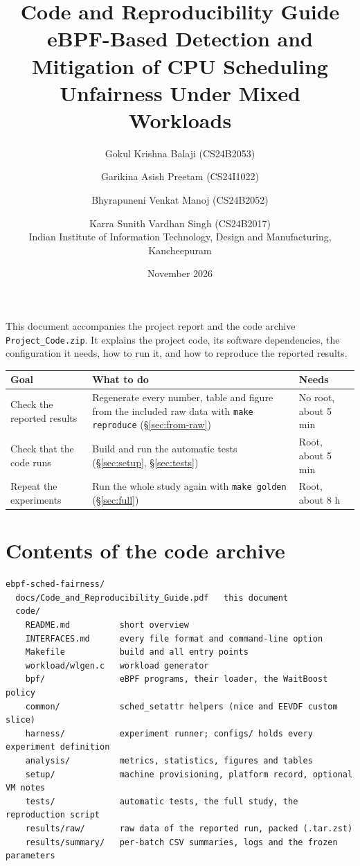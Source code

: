 \documentclass[10.5pt,a4paper]{article}
\title{\textbf{Code and Reproducibility Guide}\\[4pt]
\large eBPF-Based Detection and Mitigation of CPU Scheduling Unfairness Under Mixed Workloads}
\author{Gokul Krishna Balaji (CS24B2053) \and Garikina Asish Preetam (CS24I1022) \and
Bhyrapuneni Venkat Manoj (CS24B2052) \and Karra Sunith Vardhan Singh (CS24B2017)\\[4pt]
\normalsize Indian Institute of Information Technology, Design and Manufacturing, Kancheepuram}
\date{November 2026}
\newcommand{\f}[1]{\texttt{#1}}
\begin{document}
\maketitle

This document accompanies the project report and the code archive \f{Project\_Code.zip}. It explains the project code, its software dependencies, the configuration it needs, how to run it, and how to reproduce the reported results.

\begin{center}
\begin{tabularx}{\textwidth}{@{}lLl@{}}
\toprule
\textbf{Goal} & \textbf{What to do} & \textbf{Needs} \\
\midrule
Check the reported results & Regenerate every number, table and figure from the included raw data with \f{make reproduce} (\S\ref{sec:from-raw}) & No root, about 5 min \\
Check that the code runs & Build and run the automatic tests (\S\ref{sec:setup}, \S\ref{sec:tests}) & Root, about 5 min \\
Repeat the experiments & Run the whole study again with \f{make golden} (\S\ref{sec:full}) & Root, about 8 h \\
\bottomrule
\end{tabularx}
\end{center}

\section{Contents of the code archive}

\begin{lstlisting}
ebpf-sched-fairness/
  docs/Code_and_Reproducibility_Guide.pdf   this document
  code/
    README.md          short overview
    INTERFACES.md      every file format and command-line option
    Makefile           build and all entry points
    workload/wlgen.c   workload generator
    bpf/               eBPF programs, their loader, the WaitBoost policy
    common/            sched_setattr helpers (nice and EEVDF custom slice)
    harness/           experiment runner; configs/ holds every experiment definition
    analysis/          metrics, statistics, figures and tables
    setup/             machine provisioning, platform record, optional VM notes
    tests/             automatic tests, the full study, the reproduction script
    results/raw/       raw data of the reported run, packed (.tar.zst)
    results/summary/   per-batch CSV summaries, logs and the frozen parameters
\end{lstlisting}
\end{document}
